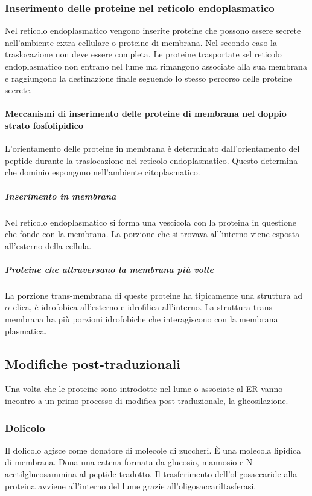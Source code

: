 		\subsubsection{Inserimento delle proteine nel reticolo endoplasmatico}
		Nel reticolo endoplasmatico vengono inserite proteine che possono essere secrete nell'ambiente extra-cellulare o proteine di membrana.
		Nel secondo caso la traslocazione non deve essere completa.
		Le proteine trasportate sel reticolo endoplasmatico non entrano nel lume ma rimangono associate alla sua membrana e raggiungono la destinazione finale seguendo lo stesso percorso delle proteine secrete.

			\paragraph{Meccanismi di inserimento delle proteine di membrana nel doppio strato fosfolipidico}
			L'orientamento delle proteine in membrana \`e determinato dall'orientamento del peptide durante la traslocazione nel reticolo endoplasmatico.
			Questo determina che dominio espongono nell'ambiente citoplasmatico.

				\subparagraph{Inserimento in membrana}
				Nel reticolo endoplasmatico si forma una vescicola con la proteina in questione che fonde con la membrana.
				La porzione che si trovava all'interno viene esposta all'esterno della cellula.

				\subparagraph{Proteine che attraversano la membrana pi\`u volte}
				La porzione trans-membrana di queste proteine ha tipicamente una struttura ad $\alpha$-elica, \`e idrofobica all'esterno e idrofilica all'interno.
			La struttura trans-membrana ha pi\`u porzioni idrofobiche che interagiscono con la membrana plasmatica.

	\subsection{Modifiche post-traduzionali}
	Una volta che le proteine sono introdotte nel lume o associate al ER vanno incontro a un primo processo di modifica post-traduzionale, la glicosilazione.

		\subsubsection{Dolicolo}
		Il dolicolo agisce come donatore di molecole di zuccheri.
		\`E una molecola lipidica di membrana.
		Dona una catena formata da glucosio, mannosio e N-acetilglucosammina al peptide tradotto.
		Il trasferimento dell'oligosaccaride alla proteina avviene all'interno del lume grazie all'oligosaccariltasferasi.

